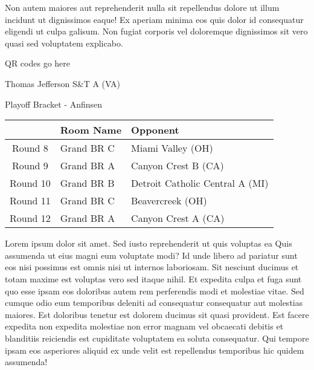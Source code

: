 \documentclass{article}%
\begin{document}
\newline%
Non autem maiores aut reprehenderit nulla sit repellendus dolore ut illum incidunt ut dignissimos eaque! Ex aperiam minima eos quis dolor id consequatur eligendi ut culpa galisum. Non fugiat corporis vel doloremque dignissimos sit vero quasi sed voluptatem explicabo.\newline%
\newline%
%
\vspace*{30pt}%
\begin{center}%
\begin{Huge}%
QR codes go here%
\end{Huge}%
\end{center}%
\newpage%
\begin{center}%
\begin{Huge}%
Thomas Jefferson S\&T A (VA)%
\end{Huge}%
\vspace*{8pt}%
\linebreak%
\begin{Large}%
Playoff Bracket {-} Anfinsen%
\end{Large}%
\end{center}%
%
\begin{tabularx}{\textwidth}{|c|Y|Y|}%
\hline%
&Room Name&Opponent\\%
\hline%
Round 8&Grand BR C&Miami Valley (OH)\\%
Round 9&Grand BR A&Canyon Crest B (CA)\\%
Round 10&Grand BR B&Detroit Catholic Central A (MI)\\%
Round 11&Grand BR C&Beavercreek (OH)\\%
Round 12&Grand BR A&Canyon Crest A (CA)\\%
\hline%
\end{tabularx}%
\vspace*{8pt}%
\linebreak%
\newline%
\newline%
Lorem ipsum dolor sit amet. Sed iusto reprehenderit ut quis voluptas ea Quis assumenda ut eius magni eum voluptate modi? Id unde libero ad pariatur sunt eos nisi possimus est omnis nisi ut internos laboriosam. Sit nesciunt ducimus et totam maxime est voluptas vero sed itaque nihil. Et expedita culpa et fuga sunt quo esse ipsam eos doloribus autem rem perferendis modi et molestiae vitae.\newline%
\newline%
Sed cumque odio eum temporibus deleniti ad consequatur consequatur aut molestias maiores. Est doloribus tenetur est dolorem ducimus sit quasi provident. Est facere expedita non expedita molestiae non error magnam vel obcaecati debitis et blanditiis reiciendis est cupiditate voluptatem ea soluta consequatur. Qui tempore ipsam eos asperiores aliquid ex unde velit est repellendus temporibus hic quidem assumenda!\newline%
\end{document}

